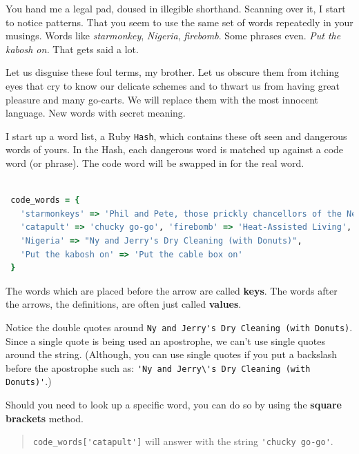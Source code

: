 \documentclass[10pt,twoside]{report}
\begin{document}
You hand me a legal pad, doused in illegible shorthand.  Scanning over
it, I start to notice patterns.  That you seem to use the same set of
words repeatedly in your musings.  Words like {\em starmonkey}, {\em
  Nigeria}, {\em firebomb}.  Some phrases even.  {\em Put the kabosh
  on.} That gets said a lot.

Let us disguise these foul terms, my brother.  Let us obscure them
from itching eyes that cry to know our delicate schemes and to thwart
us from having great pleasure and many go-carts. We will replace them
with the most innocent language.  New words with secret meaning.

I start up a word list, a Ruby \lstinline[breaklines=true]|Hash|,
which contains these oft seen and dangerous words of yours. In the
Hash, each dangerous word is matched up against a code word (or
phrase).  The code word will be swapped in for the real word.


\begin{lstlisting}[basicstyle=\ttfamily\color{basiccolor},
    commentstyle = \ttfamily\color{commentcolor},
    keywordstyle=\ttfamily\color{keywordscolor},
    stringstyle=\color{stringcolor},
    language=Ruby,
    basicstyle=\small\ttfamily,
    showstringspaces=false,
  ]

 code_words = {
   'starmonkeys' => 'Phil and Pete, those prickly chancellors of the New Reich',
   'catapult' => 'chucky go-go', 'firebomb' => 'Heat-Assisted Living',
   'Nigeria' => "Ny and Jerry's Dry Cleaning (with Donuts)",
   'Put the kabosh on' => 'Put the cable box on'
 }

\end{lstlisting}

The words which are placed before the arrow are called {\bf keys}.
The words after the arrows, the definitions, are often just called
{\bf values}.

Notice the double quotes around \lstinline[breaklines=true]|Ny and Jerry's Dry Cleaning (with Donuts)|.  
Since a single quote is being used an apostrophe, we can't use single
quotes around the string.  (Although, you can use single quotes if you
put a backslash before the apostrophe such as:
\lstinline[breaklines=true]|'Ny and Jerry\'s Dry Cleaning (with Donuts)'|.)

Should you need to look up a specific word, you can do so by using the
{\bf square brackets} method.

\begin{quote}
\lstinline[breaklines=true]|code_words['catapult']| will answer with
the string \lstinline[breaklines=true]|'chucky go-go'|.\end{quote}
\end{document}

